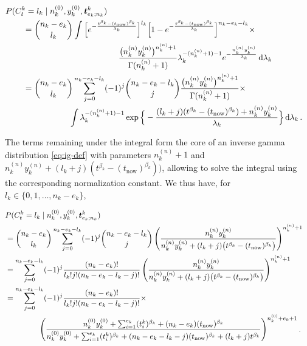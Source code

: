 \documentclass[Journal,letterpaper]{ascelike-new}
\newcommand{\dd}{\,\mathrm{d}}
\renewcommand{\vec}[1]{{\bm#1}}
\newcommand{\uz}{^{(0)}} %
\newcommand{\un}{^{(n)}} %
\def\ykz{y\uz_k}
\def\ykn{y\un_k}
\def\nkz{n\uz_k}
\def\nkn{n\un_k}
\def\tnow{t_\text{now}}
\begin{document}
\begin{linenomath*}
\begin{align}
\lefteqn{P(C^k_t = l_k\mid\nkz,\ykz, \vec{t}^k_{e_k;n_k})}\hspace*{5ex} \nonumber\\
 &= \binom{n_k - e_k}{l_k} \int \Big[    e^{-\frac{t^{\beta_k} - (\tnow)^{\beta_k}}{\lambda_k}}\Big]^{l_k}
                                  \Big[1 - e^{-\frac{t^{\beta_k} - (\tnow)^{\beta_k}}{\lambda_k}}\Big]^{n_k - e_k - l_k}
    \times \nonumber\\ & \hspace*{27ex}
    \frac{\big(\nkn\ykn\big)^{\nkn + 1}}{\Gamma(\nkn+1)} \lambda_k^{-(\nkn + 1) - 1} e^{-\frac{\nkn\ykn}{\lambda_k}} \dd \lambda_k \nonumber\\
 &= \binom{n_k - e_k}{l_k} \sum_{j=0}^{n_k-e_k-l_k} (-1)^j \binom{n_k - e_k - l_k}{j} \frac{\big(\nkn\ykn\big)^{\nkn + 1}}{\Gamma(\nkn+1)} 
    \times \nonumber\\ & \hspace*{13ex}
    \int \lambda_k^{-(\nkn + 1) - 1} \exp\Big\{-\frac{(l_k + j) (t^{\beta_k} - (\tnow)^{\beta_k}) + \nkn\ykn}{\lambda_k}\Big\} \dd \lambda_k\,.
\end{align}
\end{linenomath*}
%
The terms remaining under the integral form the core of an inverse gamma distribution \eqref{eq:ig-def}
with parameters $\nkn + 1$ and $\nkn\ykn + (l_k + j) (t^{\beta_k} - (\tnow)^{\beta_k}))$,
allowing to solve the integral using the corresponding normalization constant.
We thus have, for $l_k \in \{0,1,\ldots,n_k-e_k\}$,
\begin{linenomath*}
\begin{align}
\lefteqn{P(C^k_t = l_k\mid\nkz,\ykz, \vec{t}^k_{e_k;n_k})} \nonumber\\
 &= \binom{n_k - e_k}{l_k} \sum_{j=0}^{n_k-e_k-l_k} (-1)^j \binom{n_k - e_k - l_k}{j}
    \left(\frac{\nkn\ykn}{\nkn\ykn + (l_k + j) \big(t^{\beta_k} - (\tnow)^{\beta_k}\big)}\right)^{\nkn + 1} \nonumber\\
 &= \sum_{j=0}^{n_k-e_k-l_k} (-1)^j \frac{(n_k - e_k)!}{l_k! j! (n_k - e_k - l_k - j)!}   
    \left(\frac{\nkn\ykn}{\nkn\ykn + (l_k + j) \big(t^{\beta_k} - (\tnow)^{\beta_k}\big)}\right)^{\nkn + 1} \nonumber\\
 &= \sum_{j=0}^{n_k-e_k-l_k} (-1)^j \frac{(n_k - e_k)!}{l_k! j! (n_k - e_k - l_k - j)!} \times \nonumber\\ & \hspace*{10ex}  
    \left(\frac{\nkz\ykz + \sum_{i=1}^{e_k} (t_i^k)^{\beta_k} + (n_k-e_k)       (\tnow)^{\beta_k} }%
               {\nkz\ykz + \sum_{i=1}^{e_k} (t_i^k)^{\beta_k} + (n_k-e_k-l_k-j) (\tnow)^{\beta_k} + (l_k + j) t^{\beta_k} }\right)^{%
    \nkz + e_k + 1}.
\label{eq:postpred-priorparams}
\end{align}
\end{linenomath*}
\end{document}
